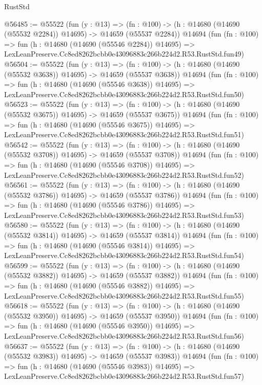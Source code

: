 \begin{lexlean}{RustStd}
\begin{coremodule}
@56485 := @55522
    (fun (y : @13) =>
    (fn : @100) -> (h : @14680 (@14690 (@55532 @2284)) @14695) -> @14659 (@55537 @2284))
    @14694
    (fun (fn : @100) =>
    fun (h : @14680 (@14690 (@55546 @2284)) @14695) =>
    LexLeanPreserve.Cc8ed8262bcbb0e43096883c266b224d2.R53.RustStd.fun49)
@56504 := @55522
    (fun (y : @13) =>
    (fn : @100) -> (h : @14680 (@14690 (@55532 @3638)) @14695) -> @14659 (@55537 @3638))
    @14694
    (fun (fn : @100) =>
    fun (h : @14680 (@14690 (@55546 @3638)) @14695) =>
    LexLeanPreserve.Cc8ed8262bcbb0e43096883c266b224d2.R53.RustStd.fun50)
@56523 := @55522
    (fun (y : @13) =>
    (fn : @100) -> (h : @14680 (@14690 (@55532 @3675)) @14695) -> @14659 (@55537 @3675))
    @14694
    (fun (fn : @100) =>
    fun (h : @14680 (@14690 (@55546 @3675)) @14695) =>
    LexLeanPreserve.Cc8ed8262bcbb0e43096883c266b224d2.R53.RustStd.fun51)
@56542 := @55522
    (fun (y : @13) =>
    (fn : @100) -> (h : @14680 (@14690 (@55532 @3708)) @14695) -> @14659 (@55537 @3708))
    @14694
    (fun (fn : @100) =>
    fun (h : @14680 (@14690 (@55546 @3708)) @14695) =>
    LexLeanPreserve.Cc8ed8262bcbb0e43096883c266b224d2.R53.RustStd.fun52)
@56561 := @55522
    (fun (y : @13) =>
    (fn : @100) -> (h : @14680 (@14690 (@55532 @3786)) @14695) -> @14659 (@55537 @3786))
    @14694
    (fun (fn : @100) =>
    fun (h : @14680 (@14690 (@55546 @3786)) @14695) =>
    LexLeanPreserve.Cc8ed8262bcbb0e43096883c266b224d2.R53.RustStd.fun53)
@56580 := @55522
    (fun (y : @13) =>
    (fn : @100) -> (h : @14680 (@14690 (@55532 @3814)) @14695) -> @14659 (@55537 @3814))
    @14694
    (fun (fn : @100) =>
    fun (h : @14680 (@14690 (@55546 @3814)) @14695) =>
    LexLeanPreserve.Cc8ed8262bcbb0e43096883c266b224d2.R53.RustStd.fun54)
@56599 := @55522
    (fun (y : @13) =>
    (fn : @100) -> (h : @14680 (@14690 (@55532 @3882)) @14695) -> @14659 (@55537 @3882))
    @14694
    (fun (fn : @100) =>
    fun (h : @14680 (@14690 (@55546 @3882)) @14695) =>
    LexLeanPreserve.Cc8ed8262bcbb0e43096883c266b224d2.R53.RustStd.fun55)
@56618 := @55522
    (fun (y : @13) =>
    (fn : @100) -> (h : @14680 (@14690 (@55532 @3950)) @14695) -> @14659 (@55537 @3950))
    @14694
    (fun (fn : @100) =>
    fun (h : @14680 (@14690 (@55546 @3950)) @14695) =>
    LexLeanPreserve.Cc8ed8262bcbb0e43096883c266b224d2.R53.RustStd.fun56)
@56637 := @55522
    (fun (y : @13) =>
    (fn : @100) -> (h : @14680 (@14690 (@55532 @3983)) @14695) -> @14659 (@55537 @3983))
    @14694
    (fun (fn : @100) =>
    fun (h : @14680 (@14690 (@55546 @3983)) @14695) =>
    LexLeanPreserve.Cc8ed8262bcbb0e43096883c266b224d2.R53.RustStd.fun57)

\end{coremodule}
\end{lexlean}
